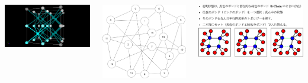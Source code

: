 \documentclass[12pt, dvipdfmx]{beamer}
\begin{document}
\begin{frame}
	\vspace{-1mm}
	\begin{columns}[T, onlytextwidth]
			\includegraphics[width=\textwidth]{8_per.png}
			\vspace{-5mm}
			\begin{center}
				\includegraphics[width=.6\textwidth]{Network.png}
			\end{center}
			\includegraphics[width=\textwidth]{bond_exchg.png}
	\end{columns}
	

\end{frame}
\end{document}
